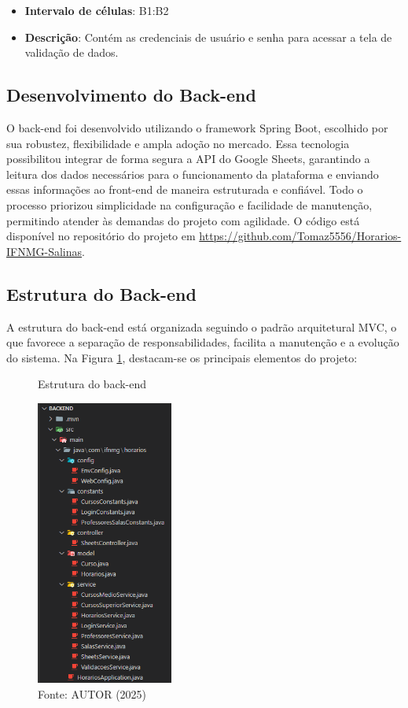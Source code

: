 \begin{itemize}
    \item \textbf{Intervalo de células}: B1:B2
    \item \textbf{Descrição}: Contém as credenciais de usuário e senha para acessar a tela de validação de dados.
\end{itemize}

\subsection{Desenvolvimento do Back-end}

O back-end foi desenvolvido utilizando o framework Spring Boot, escolhido por sua robustez, flexibilidade e ampla adoção no mercado. Essa tecnologia possibilitou integrar de forma segura a API do Google Sheets, garantindo a leitura dos dados necessários para o funcionamento da plataforma e enviando essas informações ao front-end de maneira estruturada e confiável. Todo o processo priorizou simplicidade na configuração e facilidade de manutenção, permitindo atender às demandas do projeto com agilidade. O código está disponível no repositório do projeto em \url{https://github.com/Tomaz5556/Horarios-IFNMG-Salinas}.

\subsection{Estrutura do Back-end}

A estrutura do back-end está organizada seguindo o padrão arquitetural MVC, o que favorece a separação de responsabilidades, facilita a manutenção e a evolução do sistema. Na Figura \ref{fig_back_1}, destacam-se os principais elementos do projeto:

\begin{figure}[htb]
    \centering
    \caption{Estrutura do back-end}
    \includegraphics[width=0.4\textwidth]{Figuras/back-1.png}
    \caption*{Fonte: AUTOR (2025)}
    \label{fig_back_1}
\end{figure}

